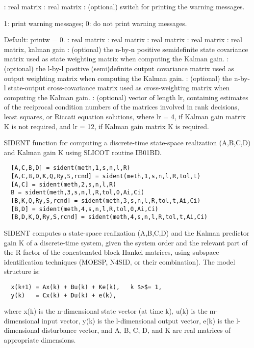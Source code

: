 \begin{parameters}
\begin{varlist}
    : real matrix
    :  real matrix
    : (optional) switch for printing the warning messages.
    \begin{varlist}
      \vname{=  } 1:  print warning messages;
      \vname{=  } 0:  do not print warning messages.
    \end{varlist}
    Default:    printw = 0.
    : real matrix
    : real matrix
    : real matrix
    : real matrix
    : real matrix, kalman gain
    : (optional) the n-by-n positive semidefinite state covariance matrix used as state weighting matrix when computing the Kalman gain.
    : (optional) the l-by-l positive (semi)definite output covariance matrix used as output weighting matrix when computing the Kalman gain.
    : (optional) the n-by-l state-output cross-covariance matrix used as cross-weighting matrix when computing the Kalman gain.
    : (optional) vector of length lr, containing estimates of the reciprocal condition numbers of the matrices involved in rank decisions, least squares, or Riccati equation solutions, where   lr = 4,  if Kalman gain matrix K is not required, and  lr = 12, if Kalman gain matrix K is required.
  \end{varlist}
\end{parameters}
\begin{mandescription}
  SIDENT function for computing a discrete-time state-space realization
  (A,B,C,D) and Kalman gain K using SLICOT routine IB01BD.
\begin{verbatim}
  [A,C,B,D] = sident(meth,1,s,n,l,R)
  [A,C,B,D,K,Q,Ry,S,rcnd] = sident(meth,1,s,n,l,R,tol,t)
  [A,C] = sident(meth,2,s,n,l,R)
  B = sident(meth,3,s,n,l,R,tol,0,Ai,Ci)
  [B,K,Q,Ry,S,rcnd] = sident(meth,3,s,n,l,R,tol,t,Ai,Ci)
  [B,D] = sident(meth,4,s,n,l,R,tol,0,Ai,Ci)
  [B,D,K,Q,Ry,S,rcnd] = sident(meth,4,s,n,l,R,tol,t,Ai,Ci)
\end{verbatim}
SIDENT computes a state-space realization (A,B,C,D) and the Kalman
predictor gain K of a discrete-time system, given the system
order and the relevant part of the R factor of the concatenated 
block-Hankel matrices, using subspace identification techniques 
(MOESP, N4SID, or their combination).
The model structure is:
\begin{verbatim}
  x(k+1) = Ax(k) + Bu(k) + Ke(k),   k $>$= 1,
  y(k)   = Cx(k) + Du(k) + e(k),
\end{verbatim}
where  
x(k)  is the  n-dimensional state vector (at time k),
u(k)  is the  m-dimensional input vector,
y(k)  is the  l-dimensional output vector,
e(k)  is the  l-dimensional disturbance vector,
and  A, B, C, D, and K  are real matrices of appropriate dimensions.
\end{mandescription}
